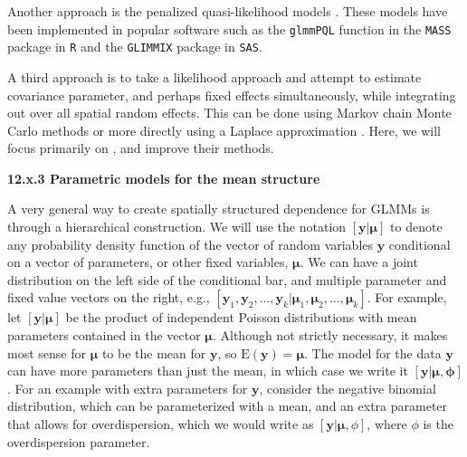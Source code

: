 \documentclass[12pt, titlepage]{article}
\begin{document}
Another approach is the penalized quasi-likelihood models \citep{breslow_approximate_1993, WolfingerEtAl1993GeneralizedLinearMixed233}.  These models have been implemented in popular software such as the \texttt{glmmPQL} function in the \texttt{MASS} package in \texttt{R} and the \texttt{GLIMMIX} package in \texttt{SAS}.

A third approach is to take a likelihood approach and attempt to estimate covariance parameter, and perhaps fixed effects simultaneously, while integrating out over all spatial random effects.   This can be done using Markov chain Monte Carlo methods \citep[e.g.,][]{christensen_monte_2004} or more directly using a Laplace approximation \citep[e.g.,][]{evangelou_estimation_2011, bonat_practical_2016}.  Here, we will focus primarily on \citet{bonat_practical_2016}, and improve their methods.




{\large \flushleft \textbf{12.x.3 Parametric models for the mean structure}}

A very general way to create spatially structured dependence for GLMMs is through a hierarchical construction.  We will use the notation $[\mathbf{y}|\boldsymbol{\mu}]$ to denote any probability density function of the vector of random variables $\mathbf{y}$ conditional on a vector of parameters, or other fixed variables, $\boldsymbol{\mu}$. We can have a joint distribution on the left side of the conditional bar, and multiple parameter and fixed value vectors on the right, e.g., $[\mathbf{y}_{1},\mathbf{y}_{2}, \ldots, \mathbf{y}_{k} | \boldsymbol{\mu}_{1}, \boldsymbol{\mu}_{2}, \ldots, \boldsymbol{\mu}_{k}]$. For example, let $[\mathbf{y}|\boldsymbol{\mu}]$ be the product of independent Poisson distributions with mean parameters contained in the vector $\boldsymbol{\mu}$.  Although not strictly necessary, it makes most sense for $\boldsymbol{\mu}$ to be the mean for $\mathbf{y}$, so $\textrm{E}(\mathbf{y}) = \boldsymbol{\mu}$. The model for the data $\mathbf{y}$ can have more parameters than just the mean, in which case we write it $[\mathbf{y}|\boldsymbol{\mu},\boldsymbol{\phi}]$. For an example with extra parameters for $\mathbf{y}$, consider the negative binomial distribution, which can be parameterized with a mean, and an extra parameter that allows for overdispersion, which we would write as $[\mathbf{y}|\boldsymbol{\mu},\phi]$, where $\phi$ is the overdispersion parameter.
\end{document}
